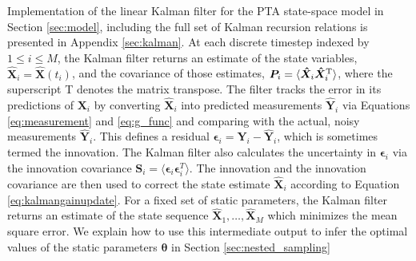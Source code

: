 \documentclass[fleqn,usenatbib,useAMS]{mnras}
\begin{document}
Implementation of the linear Kalman filter for the PTA state-space model in Section \ref{sec:model}, including the full set of Kalman recursion relations is presented in Appendix \ref{sec:kalman}. At each discrete timestep indexed by $ 1 \leq i  \leq M$, the Kalman filter returns an estimate of the state variables, $\hat{\boldsymbol{X}}_i = \hat{\boldsymbol{X}}(t_i)$, and the covariance of those estimates, ${\boldsymbol{P}}_i = \langle {\boldsymbol{\hat X}}_i {\boldsymbol{\hat X}}_i^{\rm T} \rangle$, where the superscript T denotes the matrix transpose. The filter tracks the error in its predictions of $\boldsymbol{X}_i$ by converting ${\boldsymbol{\hat X}}_i$ into predicted measurements ${\boldsymbol{\hat Y}}_i$ via Equations \eqref{eq:measurement} and \eqref{eq:g_func} and comparing with the actual, noisy measurements ${\boldsymbol{\hat Y}}_i$. This defines a residual $\boldsymbol{\epsilon}_i = \boldsymbol{Y}_i  - \hat{\boldsymbol{Y}}_i$, which is sometimes termed the innovation. The Kalman filter also calculates the uncertainty in $\boldsymbol{\epsilon}_i$ via the innovation covariance $\boldsymbol{S}_i = \langle \boldsymbol{\epsilon}_i \boldsymbol{\epsilon}_i^{T} \rangle$. The innovation and the innovation covariance are then used to correct the state estimate ${\boldsymbol{\hat X}}_i$ according to Equation \eqref{eq:kalmangainupdate}. For a fixed set of static parameters, the Kalman filter returns an estimate of the state sequence ${\boldsymbol {\hat X}}_1, \dots , {\boldsymbol{\hat X}}_M$ which minimizes the mean square error. We explain how to use this intermediate output to infer the optimal values of the static parameters ${\boldsymbol{\theta}}$ in Section \ref{sec:nested_sampling} \newline 
\end{document}
